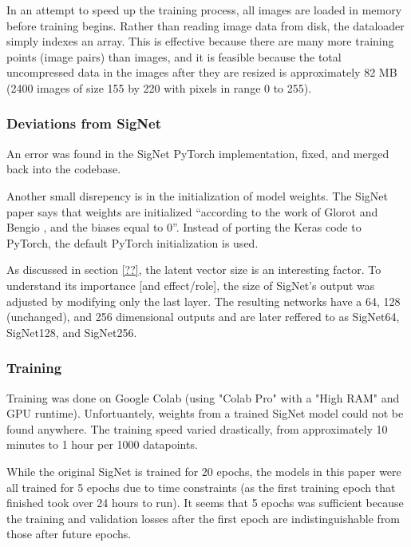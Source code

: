 In an attempt to speed up the training process, all images are loaded in memory before training begins.
Rather than reading image data from disk, the dataloader simply indexes an array.
This is effective because there are many more training points (image pairs) than images, and it is feasible because the total uncompressed data in the images after they are resized is approximately 82 MB (2400 images of size 155 by 220 with pixels in range 0 to 255).

\subsubsection{Deviations from SigNet}
An error was found in the SigNet PyTorch implementation, fixed, and merged back into the codebase.

Another small disrepency is in the initialization of model weights.
The SigNet paper says that weights are initialized ``according to the work
of Glorot and Bengio \cite{glorot_bengio}, and the biases equal to 0''\cite{sig_net}.
Instead of porting the Keras code to PyTorch, the default PyTorch initialization is used.


As discussed in section \ref{??}, the latent vector size is an interesting factor.
To understand its importance [and effect/role], the size of SigNet's output was adjusted by modifying only the last layer.
The resulting networks have a 64, 128 (unchanged), and 256 dimensional outputs and are later reffered to as SigNet64, SigNet128, and SigNet256.

\subsubsection{Training}
Training was done on Google Colab (using "Colab Pro" with a "High RAM" and GPU runtime).
Unfortuantely, weights from a trained SigNet model could not be found anywhere.
The training speed varied drastically, from approximately 10 minutes to 1 hour per 1000 datapoints.

While the original SigNet is trained for 20 epochs, the models in this paper were all trained for 5 epochs due to time constraints (as the first training epoch that finished took over 24 hours to run).
It seems that 5 epochs was sufficient because the training and validation losses after the first epoch are indistinguishable from those after future epochs.


